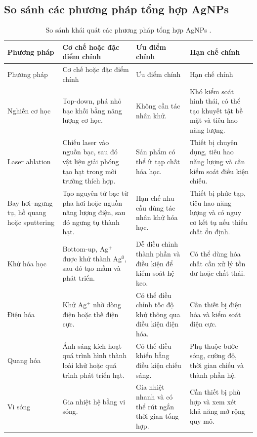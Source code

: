 \subsection{So sánh các phương pháp tổng hợp AgNPs}
\begingroup
\small
\begin{longtable}{@{}>{\raggedright\arraybackslash}p{}>{\raggedright\arraybackslash}p{}>{\raggedright\arraybackslash}p{}>{\raggedright\arraybackslash}p{}@{}}
\caption[So sánh khái quát các phương pháp tổng hợp AgNPs]{So sánh khái quát các phương pháp tổng hợp AgNPs \parencite{iravani2014,nguyen2023,lee2019}.}\\
\toprule
Phương pháp & Cơ chế hoặc đặc điểm chính & Ưu điểm chính & Hạn chế chính \\
\midrule
\endfirsthead
\toprule
Phương pháp & Cơ chế hoặc đặc điểm chính & Ưu điểm chính & Hạn chế chính \\
\midrule
\endhead
\bottomrule
\endfoot
\bottomrule
\endlastfoot
Nghiền cơ học & Top-down, phá nhỏ bạc khối bằng năng lượng cơ học. & Không cần tác nhân khử. & Khó kiểm soát hình thái, có thể tạo khuyết tật bề mặt và tiêu hao năng lượng. \\
Laser ablation & Chiếu laser vào nguồn bạc, sau đó vật liệu giải phóng tạo hạt trong môi trường thích hợp. & Sản phẩm có thể ít tạp chất hóa học. & Thiết bị chuyên dụng, tiêu hao năng lượng và cần kiểm soát điều kiện chiếu. \\
Bay hơi--ngưng tụ, hồ quang hoặc sputtering & Tạo nguyên tử bạc từ pha hơi hoặc nguồn năng lượng điện, sau đó ngưng tụ thành hạt. & Hạn chế nhu cầu dùng tác nhân khử hóa học. & Thiết bị phức tạp, tiêu hao năng lượng và có nguy cơ kết tụ nếu thiếu chất ổn định. \\
Khử hóa học & Bottom-up, Ag$^+$ được khử thành Ag$^0$, sau đó tạo mầm và phát triển. & Dễ điều chỉnh thành phần và điều kiện để kiểm soát hệ keo. & Có thể dùng hóa chất cần xử lý tồn dư hoặc chất thải. \\
Điện hóa & Khử Ag$^+$ nhờ dòng điện hoặc thế điện cực. & Có thể điều chỉnh tốc độ khử thông qua điều kiện điện hóa. & Cần thiết bị điện hóa và kiểm soát điện cực. \\
Quang hóa & Ánh sáng kích hoạt quá trình hình thành loài khử hoặc quá trình phát triển hạt. & Có thể điều khiển bằng điều kiện chiếu sáng. & Phụ thuộc bước sóng, cường độ, thời gian chiếu và thành phần hệ. \\
Vi sóng & Gia nhiệt hệ bằng vi sóng. & Gia nhiệt nhanh và có thể rút ngắn thời gian tổng hợp. & Cần thiết bị phù hợp và xem xét khả năng mở rộng quy mô. \\

\end{longtable}
